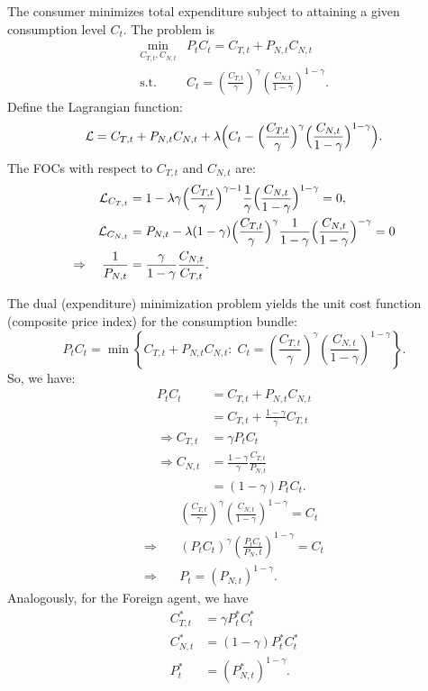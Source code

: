 \documentclass[a4paper,12pt]{article} %
\theoremstyle{nonitalic}
\begin{document}
The consumer minimizes total expenditure subject to attaining a given consumption level $C_t$. The problem is
\begin{align*}
    \min_{C_{T,t}, C_{N,t}} & P_t C_t = C_{T,t} + P_{N,t} C_{N,t} \\
    \text{s.t.} \quad &C_t = \left(\frac{C_{T,t}}{\gamma } \right)^{\gamma} \left(\frac{C_{N,t}}{1 - \gamma} \right)^{ 1-\gamma}.
\end{align*}
Define the Lagrangian function:
\[
\mathcal{L} = C_{T,t} + P_{N,t} C_{N,t} + \lambda \Bigl(C_t - \Bigl(\frac{C_{T,t}}{\gamma } \Bigr)^{\gamma} \Bigl(\frac{C_{N,t}}{1 - \gamma} \Bigr)^{ 1-\gamma}\Bigr).
\]
The FOCs with respect to $C_{T,t}$ and $C_{N,t}$ are:
\begin{align*}
    \mathcal{L}_{C_{T,t}} & = 1 - \lambda \gamma \Bigl(\frac{C_{T,t}}{\gamma } \Bigr)^{\gamma-1} \frac{1}{\gamma} \Bigl(\frac{C_{N,t}}{1 - \gamma} \Bigr)^{ 1-\gamma} = 0, \\
    \mathcal{L}_{C_{N,t}} & = P_{N,t} - \lambda (1-\gamma) \Bigl(\frac{C_{T,t}}{\gamma } \Bigr)^{\gamma} \frac{1}{1-\gamma} \Bigl(\frac{C_{N,t}}{1 - \gamma} \Bigr)^{ -\gamma} = 0 \\
    \Rightarrow \quad \frac{1}{P_{N,t}} & = \frac{\gamma}{1-\gamma} \frac{C_{N,t}}{C_{T,t}}.
\end{align*}

The dual (expenditure) minimization problem yields the unit cost function (composite price index) for the consumption bundle:
\[
P_t C_t = \min \left\{ C_{T,t} + P_{N,t} C_{N,t} : \; C_t = \left(\frac{C_{T,t}}{\gamma } \right)^{\gamma} \left(\frac{C_{N,t}}{1 - \gamma} \right)^{ 1-\gamma} \right\}.
\]
So, we have:
\begin{align*}
    P_t C_t & = C_{T,t} + P_{N,t} C_{N,t} \\
    &= C_{T,t} + \frac{1-\gamma}{\gamma} C_{T,t} \\
    \Rightarrow C_{T,t} &= \gamma P_t C_t \tag{1a}\\
    \Rightarrow C_{N,t} &= \frac{1-\gamma}{\gamma} \frac{C_{T,t}}{P_{N,t}}\\
    &= (1-\gamma) P_t C_t. \tag{1b}
\end{align*}
\begin{align*}
    & \left(\frac{C_{T,t}}{\gamma } \right)^{\gamma} \left(\frac{C_{N,t}}{1 - \gamma} \right)^{ 1-\gamma} = C_t \\
    \Rightarrow \quad & (P_t C_t)^{\gamma} \left(\frac{P_t C_t}{P_N,t}\right)^{1-\gamma} = C_t \\
    \Rightarrow \quad & P_t = (P_{N,t})^{1-\gamma}. \tag{1c} 
\end{align*}
Analogously, for the Foreign agent, we have 
\begin{align*}
    C^*_{T,t} &= \gamma P^*_t C^*_t \tag{1d}\\
    C^*_{N,t} &= (1-\gamma) P^*_t C^*_t \tag{1e}\\
    P^*_t &= (P^*_{N,t})^{1-\gamma}. \tag{1f}
\end{align*}
\end{document}
